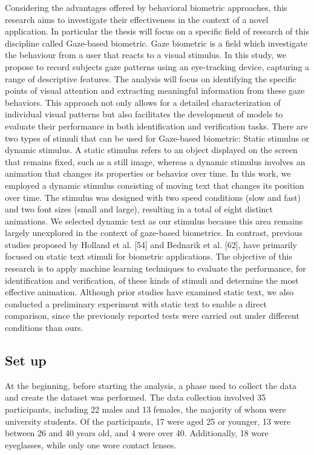 \documentclass{article}
\begin{document}
Considering the advantages offered by behavioral biometric approaches, this research aims to investigate their effectiveness in the context of a novel application.
In particular the thesis will focus on a specific field of research of this discipline called Gaze-based biometric.
Gaze biometric is a field which investigate the behaviour from a user that reacts to a visual stimulus.
In this study, we propose to record subjects gaze patterns using an eye-tracking device, capturing a range of descriptive features.
The analysis will focus on identifying the specific points of visual attention and extracting meaningful information from these gaze behaviors.
This approach not only allows for a detailed characterization of individual visual patterns but also facilitates the development of models to evaluate their performance in both identification and verification tasks.
There are two types of stimuli that can be used for Gaze-based biometric: Static stimulus or dynamic stimulus.
A static stimulus refers to an object displayed on the screen that remains fixed, such as a still image, whereas a dynamic stimulus involves an animation that changes its properties or behavior over time.
In this work, we employed a dynamic stimulus consisting of moving text that changes its position over time.
The stimulus was designed with two speed conditions (slow and fast) and two font sizes (small and large), resulting in a total of eight distinct animations.
We selected dynamic text as our stimulus because this area remains largely unexplored in the context of gaze-based biometrics.
In contrast, previous studies proposed by Holland et al. [54] and Bednarik et al. [62], have primarily focused on static text stimuli for biometric applications.
The objective of this research is to apply machine learning techniques to evaluate the performance, for identification and verification, of these kinds of stimuli and determine the most effective animation. 
Although prior studies have examined static text, we also conducted a preliminary experiment with static text to enable a direct comparison, since the previously reported tests were carried out under different conditions than ours.

\subsection{Set up}
At the beginning, before starting the analysis, a phase used to collect the data and create the dataset was performed.
The data collection involved 35 participants, including 22 males and 13 females, the majority of whom were university students.
Of the participants, 17 were aged 25 or younger, 13 were between 26 and 40 years old, and 4 were over 40. 
Additionally, 18 wore eyeglasses, while only one wore contact lenses.
\end{document}
